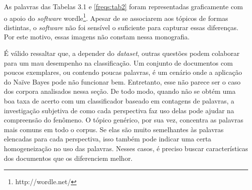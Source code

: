 
As palavras das Tabelas 3.1 e \ref{freqs:tab2} foram representadas graficamente com o apoio do \emph{software} wordle\footnote{http://wordle.net/}. Apesar de se associarem aos tópicos de formas distintas, o \emph{software} não foi sensível o suficiente para capturar essas diferenças. Por este motivo, essas imagens não constam nessa monografia.


É válido ressaltar que, a depender do \emph{dataset}, outras questões podem colaborar para um mau desempenho na classificação. Um conjunto de documentos com poucos exemplares, ou contendo poucas palavras, é um cenário onde a aplicação do Naïve Bayes pode não funcionar bem. Entretanto, esse não parece ser o caso dos corpora analisados nessa seção. De todo modo, quando não se obtém uma boa taxa de acerto com um classificador baseado em contagens de palavras, a investigação subjetiva de como cada perspectiva faz uso delas pode ajudar na compreensão do fenômeno. O tópico genérico, por sua vez, concentra as palavras mais comuns em todo o corpus. Se elas são muito semelhantes às palavras elencadas para cada perspectiva, isso também pode indicar uma certa homogeneização no uso das palavras. Nesses casos, é preciso buscar características dos documentos que os diferenciem melhor. %

